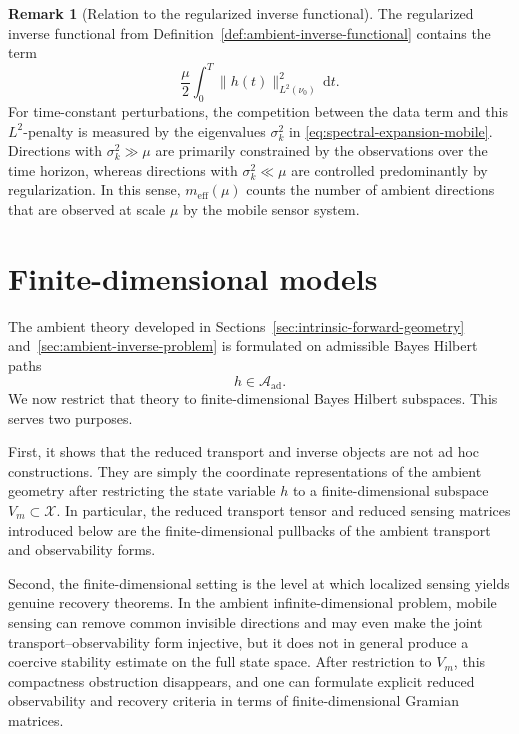 \documentclass{article}
\theoremstyle{definition}
\newtheorem{remark}[theorem]{Remark}
\renewcommand{\d}{\mathrm{d}}
\begin{document}
\begin{remark}[Relation to the regularized inverse functional]
    \label{rem:resolved-unresolved-interpretation}
    The regularized inverse functional from Definition~\ref{def:ambient-inverse-functional} contains
    the term
    \[
        \frac{\mu}{2}\int_0^T \|h(t)\|_{L^2(\nu_0)}^2\,\d t.
    \]
    For time-constant perturbations, the competition between the data term and this \(L^2\)-penalty is
    measured by the eigenvalues \(\sigma_k^2\) in
    \eqref{eq:spectral-expansion-mobile}. Directions with \(\sigma_k^2\gg\mu\) are primarily
    constrained by the observations over the time horizon, whereas directions with \(\sigma_k^2\ll\mu\)
    are controlled predominantly by regularization. In this sense, \(m_{\mathrm{eff}}(\mu)\) counts the
    number of ambient directions that are observed at scale \(\mu\) by the mobile sensor system.
\end{remark}


\section{Finite-dimensional models}
\label{sec:finite-dimensional-reduction}

The ambient theory developed in Sections~\ref{sec:intrinsic-forward-geometry}
and~\ref{sec:ambient-inverse-problem} is formulated on admissible Bayes Hilbert paths
\[
    h\in \mathcal A_{\mathrm{ad}}.
\]
We now restrict that theory to finite-dimensional Bayes Hilbert subspaces. This serves two
purposes.

First, it shows that the reduced transport and inverse objects are not ad hoc constructions.
They are simply the coordinate representations of the ambient geometry after restricting the
state variable \(h\) to a finite-dimensional subspace \(V_m\subset \mathcal X\). In particular, the
reduced transport tensor and reduced sensing matrices introduced below are the finite-dimensional
pullbacks of the ambient transport and observability forms.

Second, the finite-dimensional setting is the level at which localized sensing yields genuine
recovery theorems. In the ambient infinite-dimensional problem, mobile sensing can remove
common invisible directions and may even make the joint transport--observability form injective,
but it does not in general produce a coercive stability estimate on the full state space. After
restriction to \(V_m\), this compactness obstruction disappears, and one can formulate explicit
reduced observability and recovery criteria in terms of finite-dimensional Gramian matrices.
\end{document}

